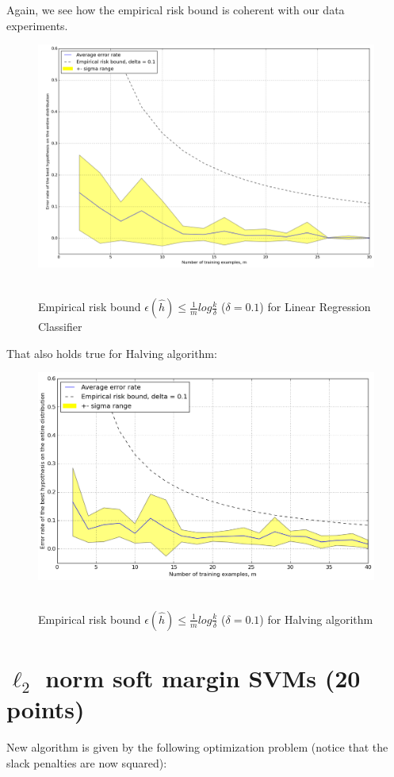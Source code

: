 \documentclass{article}
\begin{document}
Again, we see how the empirical risk bound is coherent with our data experiments. 
\begin{figure}[!htb]
	\centering
	\includegraphics[width=5.5in,clip,keepaspectratio]{emp_risk_bound_v1.png}\
	\caption{Empirical risk bound $\epsilon (\hat{h}) \le \frac{1}{m} log \frac{k}{\delta}$ ($\delta=0.1$) for Linear Regression Classifier}	
\end{figure}
That also holds true for Halving algorithm:
\begin{figure}[!htb]
	\centering
	\includegraphics[width=5.5in,clip,keepaspectratio]{emp_risk_bound_finite_H.png}\
	\caption{Empirical risk bound $\epsilon (\hat{h}) \le \frac{1}{m} log \frac{k}{\delta}$ ($\delta=0.1$) for Halving algorithm}	
\end{figure}



\pagebreak
\section{$\ell_2$ norm soft margin SVMs (20 points)}
New algorithm is given by the following optimization problem (notice that the slack penalties are now squared):
\end{document}
